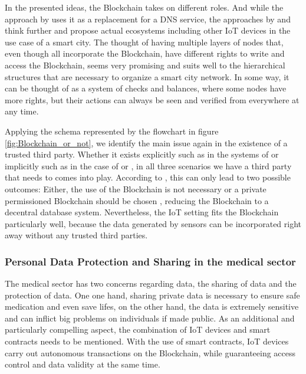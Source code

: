 In the presented ideas, the Blockchain takes on different roles. And while the approach by \cite{Rowan2017} uses it as a replacement for a DNS service, the approaches by \cite{DorriSteger2017} and \cite{Sharma2017} think further and propose actual ecosystems including other IoT devices in the use case of a smart city.
The thought of having multiple layers of nodes that, even though all incorporate the Blockchain, have different rights to write and access the Blockchain, seems very promising and suits well to the hierarchical structures that are necessary to organize a smart city network. In some way, it can be thought of as a system of checks and balances, where some nodes have more rights, but their actions can always be seen and verified from everywhere at any time.

Applying the schema represented by the flowchart in figure \ref{fig:Blockchain_or_not}, we identify the main issue again in the existence of a trusted third party. Whether it exists explicitly such as in the systems of \cite{Sharma2017} or implicitly such as in the case of \cite{Rowan2017} or \cite{DorriSteger2017}, in all three scenarios we have a third party that needs to comes into play.
According to \cite{Wust2017}, this can only lead to two possible outcomes: Either, the use of the Blockchain is not necessary or a private permissioned Blockchain should be chosen \cite{Wust2017}, reducing the Blockchain to a decentral database system.
Nevertheless, the IoT setting fits the Blockchain particularly well, because the data generated by sensors can be incorporated right away without any trusted third parties.

\subsubsection{Personal Data Protection and Sharing in the medical sector}
The medical sector has two concerns regarding data, the sharing of data and the protection of data. One one hand, sharing private data is necessary to ensure safe medication and even save lifes, on the other hand, the data is extremely sensitive and can inflict big problems on individuals if made public.
As an additional and particularly compelling aspect, the combination of IoT devices and smart contracts needs to be mentioned. With the use of smart contracts, IoT devices carry out autonomous transactions on the Blockchain, while guaranteeing access control and data validity at the same time.

